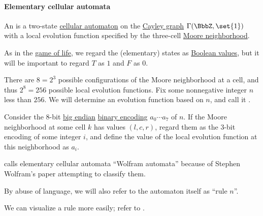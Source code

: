 \paragraph{Elementary cellular automata}

\begin{definition}\label{def:elementary_cellular_automaton}
  An  is a two-state \hyperref[def:cellular_automaton]{cellular automaton} on the \hyperref[def:cayley_graph]{Cayley graph} \( \Gamma(\BbbZ, \set{ 1 }) \) with a local evolution function specified by the three-cell \hyperref[def:cayley_graph_neighborhood/moore]{Moore neighborhood}.

  As in the \hyperref[def:game_of_life]{game of life}, we regard the (elementary) states as \hyperref[def:boolean_value]{Boolean values}, but it will be important to regard \( T \) as \( 1 \) and \( F \) as \( 0 \).

  There are \( 8 = 2^3 \) possible configurations of the Moore neighborhood at a cell, and thus \( 2^8 = 256 \) possible local evolution functions. Fix some nonnegative integer \( n \) less than \( 256 \). We will determine an evolution function based on \( n \), and call it .

  Consider the \( 8 \)-bit \hyperref[def:endianness/big]{big endian} \hyperref[def:fixed_eength_nonnegative_integer_encoding]{binary encoding} \( a_0 \cdots a_7 \) of \( n \). If the Moore neighborhood at some cell \( k \) has values \( (l, c, r) \), regard them as the \( 3 \)-bit encoding of some integer \( i \), and define the value of the local evolution function at this neighborhood as \( a_i \).
\end{definition}
\begin{comments}
  \item {} calls elementary cellular automata \enquote{Wolfram automata} because of Stephen Wolfram's paper \cite{Wolfram1983StatisticalMechanicsOfCellularAutomata} attempting to classify them.

  \item By abuse of language, we will also refer to the automaton itself as \enquote{rule \( n \)}.

  \item We can visualize a rule more easily; refer to .
\end{comments}


